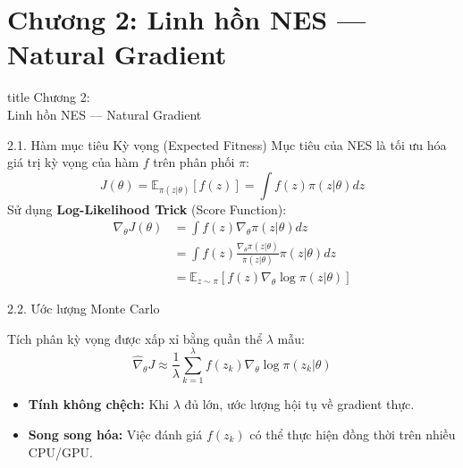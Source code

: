 \documentclass[10pt,xcolor=dvipsnames]{beamer}
\newcommand{\E}{\mathbb{E}}
\begin{document}
	\section{Chương 2: Linh hồn NES — Natural Gradient}
	
	\begin{frame}
		\centering
		\begin{beamercolorbox}[sep=16pt,center,shadow=true,rounded=true]{title}
			\huge Chương 2:\\[0.5em] Linh hồn NES — Natural Gradient \par
		\end{beamercolorbox}
	\end{frame}
	
	\begin{frame}{2.1. Hàm mục tiêu Kỳ vọng (Expected Fitness)}
		Mục tiêu của NES là tối ưu hóa giá trị kỳ vọng của hàm $f$ trên phân phối $\pi$:
		\[ J(\theta) = \E_{\pi(z|\theta)}[f(z)] = \int f(z) \pi(z|\theta) dz \]
		Sử dụng \textbf{Log-Likelihood Trick} (Score Function):
		\begin{align*}
			\nabla_\theta J(\theta) &= \int f(z) \nabla_\theta \pi(z|\theta) dz \\
			&= \int f(z) \frac{\nabla_\theta \pi(z|\theta)}{\pi(z|\theta)} \pi(z|\theta) dz \\
			&= \E_{z \sim \pi} \left[ f(z) \nabla_\theta \log \pi(z|\theta) \right]
		\end{align*}
	\end{frame}
	
	\begin{frame}{2.2. Ước lượng Monte Carlo}
		
		Tích phân kỳ vọng được xấp xỉ bằng quần thể $\lambda$ mẫu:
		\[ \hat{\nabla}_\theta J \approx \frac{1}{\lambda} \sum_{k=1}^{\lambda} f(z_k) \nabla_\theta \log \pi(z_k|\theta) \]
		\begin{itemize}
			\item \textbf{Tính không chệch:} Khi $\lambda$ đủ lớn, ước lượng hội tụ về gradient thực.
			\item \textbf{Song song hóa:} Việc đánh giá $f(z_k)$ có thể thực hiện đồng thời trên nhiều CPU/GPU.
		\end{itemize}
	\end{frame}
	
\end{document}
